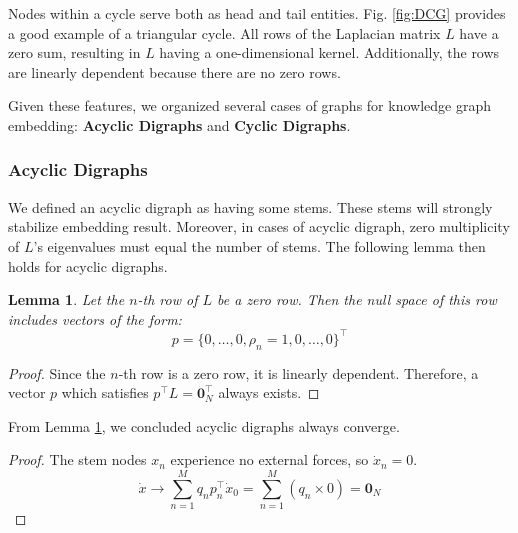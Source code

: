 \documentclass[letterpaper, 10 pt, conference]{ieeeconf}  %
\newtheorem{lemma}[theorem]{Lemma}
\begin{document}
Nodes within a cycle serve both as head and tail entities. Fig. \ref{fig:DCG} provides a good example of a triangular cycle. All rows of the Laplacian matrix \( L \) have a zero sum, resulting in \( L \) having a one-dimensional kernel. Additionally, the rows are linearly dependent because there are no zero rows.


Given these features, we organized several cases of graphs for knowledge graph embedding: \textbf{Acyclic Digraphs} and \textbf{Cyclic Digraphs}.

\subsubsection{Acyclic Digraphs}

We defined an acyclic digraph as having some stems. These stems will strongly stabilize embedding result. Moreover, in cases of acyclic digraph, zero multiplicity of \(L\)'s eigenvalues must equal the number of stems. The following lemma then holds for acyclic digraphs.

\begin{lemma}\label{lemma:p}
Let the \( n \)-th row of \( L \) be a zero row. Then the null space of this row includes vectors of the form:
\begin{equation}\label{eq:DAG_left}
    p = \{0, \dots, 0, \rho_n = 1, 0, \dots, 0\}^\top
\end{equation}
\end{lemma}

\begin{proof}
Since the \( n \)-th row is a zero row, it is linearly dependent. Therefore, a vector \( p \) which satisfies \( p^\top L = \mathbf{0}_N^\top \) always exists.
\end{proof}

From Lemma \ref{lemma:p}, we concluded acyclic digraphs always converge.

\begin{proof}
The stem nodes \( x_n \) experience no external forces, so \( \dot{x}_n = 0 \). 
\begin{equation}\label{eq:0_N}
    \dot{x} \rightarrow \sum_{n=1}^M q_n p_n^\top \dot{x}_0 = \sum_{n=1}^M (q_n \times 0) = \mathbf{0}_N
\end{equation}
\end{proof}
\end{document}
